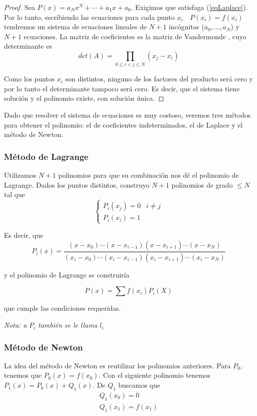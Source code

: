 \documentclass[nochap]{apuntes}
\begin{document}
\begin{proof}
Sea $P(x) = a_Nx^N +\dotsb + a_1x + a_0$. Exigimos que satisfaga (\ref{eqLaplace}). Por lo tanto, escribiendo las ecuaciones para cada punto $x_i\quad P(x_i)=f(x_i)$ tendremos un sistema de ecuaciones lineales de $N+1$ incógnitas ($a_0,\dotsc,a_N$) y $N+1$ ecuaciones. La matriz de coeficientes es la matriz de Vandermonde , cuyo determinante es 
\[det(A) = \prod_{0≤i<j≤N}(x_j - x_i) \]

Como los puntos $x_i$ son distintos, ninguno de los factores del producto será cero y por lo tanto el determinante tampoco será cero. Es decir, que el sistema tiene solución y el polinomio existe, con solución única.
\end{proof}

Dado que resolver el sistema de ecuaciones es muy costoso, veremos tres métodos para obtener el polinomio: el de coeficientes indeterminados, el de Laplace y el método de Newton.

\subsubsection{Método de Lagrange}
Utilizamos $N+1$ polinomios para que su combinación nos dé el polinomio de Lagrange. Dados los puntos distintos, construyo $N+1$ polinomios de grado $≤N$ tal que 
\[\begin{cases}P_i(x_j) = 0& i\neq j \\ P_i(x_i) = 1 \end{cases}\]

Es decir, que \label{polLagrange}
\[ P_i(x) = \frac{(x-x_0)\dotsb (x-x_{i-1})(x-x_{i+1})\dotsb (x-x_N)}{(x_i - x_0)\dotsb  (x_i-x_{i-1})(x_i-x_{i+1})\dotsb(x_i-x_N)} \]

y el polinomio de Lagrange se construiría 

\[ P(x) = \sum f(x_i)P_i(X) \]

que cumple las condiciones requeridas. 

\textit{Nota: a $P_i$ también se le llama $l_i$}

\subsubsection{Método de Newton}

La idea del método de Newton es reutilizar los polinomios anteriores. Para $P_0$, tenemos que $P_0(x) = f(x_0)$. Con el siguiente polinomio tenemos $P_1(x) = P_0(x) + Q_1(x)$. De $Q_1$ buscamos que \begin{gather*}Q_1(x_0) = 0\\Q_1(x_1) = f(x_1)\end{gather*}
\end{document}
